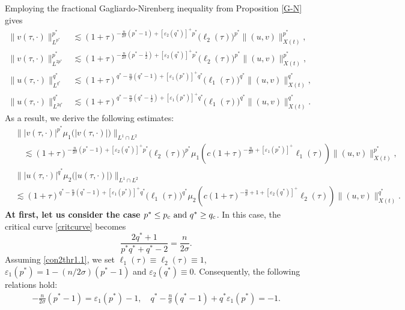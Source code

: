 \documentclass[11pt,reqno]{amsart}
\newcommand{\tron}[1]{\left( #1 \right)}
\numberwithin{equation}{section}
\begin{document}
Employing the fractional Gagliardo-Nirenberg inequality from Proposition \ref{G-N} gives
$$
\begin{aligned}
\big\|v(\tau, \cdot)\big\|_{L^{p^*}}^{p^*} & \lesssim (1+\tau)^{-\frac{n}{2 \sigma}\left(p^*-1\right)+[\varepsilon_2(q^*)]^{+}p^*}\big(\ell_2(\tau)\big)^{p^*}\|(u,v)\|_{X(t)}^{p^*}, \\
\big\|v(\tau, \cdot)\big\|_{L^{2 p^*}}^{p^*} & \lesssim(1+\tau)^{-\frac{n}{2\sigma}\left(p^*-\frac{1}{2}\right)+[\varepsilon_2(q^*)]^{+}p^*}\big(\ell_2(\tau)\big)^{p^*}\|(u,v)\|_{X(t)}^{p^*},\\
\big\|u(\tau, \cdot)\big\|_{L^{q^*}}^{q^*} & \lesssim(1+\tau)^{q^*-\frac{n}{\sigma}\left(q^*-1\right)+[\varepsilon_1(p^*)]^+q^*}\big(\ell_1(\tau)\big)^{q^*}\|(u,v)\|_{X(t)}^{q^*}, \\
\big\|u(\tau, \cdot)\big\|_{L^{2q^*}}^{q^*} & \lesssim(1+\tau)^{q^*-\frac{n}{\sigma}\left(q^*-\frac{1}{2}\right)+[\varepsilon_1(p^*)]^{+}q^*}\big(\ell_1(\tau)\big)^{q^*}\|(u,v)\|_{X(t)}^{q^*}.
\end{aligned}
$$
As a result, we derive the following estimates:
\begin{align}
&\big\||v(\tau, \cdot)|^{p^*} \mu_1\big(|v(\tau, \cdot)|\big)\big\|_{L^1\cap L^2}\nonumber\\
&\quad\lesssim (1+\tau)^{-\frac{n}{2 \sigma}\left(p^*-1\right)+[\varepsilon_2(q^*)]^{+}p^*}\big(\ell_2(\tau)\big)^{p^*}\mu_1\tron{c(1+\tau)^{-\frac{n}{2\sigma}+[\varepsilon_1(p^*)]^{+}}\ell_1(\tau)}\|(u,v)\|^{p^*}_{X(t)},\label{eq6thr1.1}\\
&\big\||u(\tau, \cdot)|^{q^*} \mu_2\big(|u(\tau, \cdot)|\big)\big\|_{L^1 \cap L^2}\nonumber\\
&\lesssim (1+\tau)^{q^*-\frac{n}{\sigma}\left(q^*-1\right)+[\varepsilon_1(p^*)]^+q^*}\big(\ell_1(\tau)\big)^{q^*}\mu_2\tron{c(1+\tau)^{-\frac{n}{\sigma}+1+[\varepsilon_2(q^*)]^{+}}\ell_2(\tau)}\|(u,v)\|^{q^*}_{X(t)}.\label{eq7thr1.1}
\end{align}
{\bf At first, let us consider the case $p^*\leq p_{\rm c}\text{ and }q^*\geq q_{\rm c}$}. In this case, the critical curve \eqref{critcurve} becomes
\begin{equation}\label{critcurvecase1}
    \frac{2q^*+1}{p^*q^*+q^*-2}=\frac{n}{2\sigma}.
\end{equation}
Assuming \eqref{con2thr1.1}, we set $\ell_1(\tau) \equiv \ell_2(\tau) \equiv 1$, $\varepsilon_1(p^*)= 1 - (n/2\sigma)(p^*-1)$ and $\varepsilon_2(q^*) \equiv 0$. Consequently, the following relations hold:
\[
\begin{aligned}
-\frac{n}{2\sigma}\left(p^*-1\right)=\varepsilon_1(p^*)-1,\quad q^*-\frac{n}{\sigma}\left(q^*-1\right)+q^*\varepsilon_1(p^*)=-1.
\end{aligned}
\]
\end{document}
